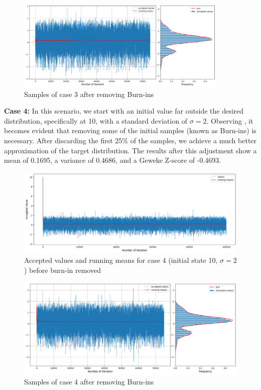 \begin{example}
	\begin{figure}[H]
		\centering
		\includegraphics[width=0.9\textwidth]{./images/metropolis/example1/sample-3-value-hist-bo.png}
		\caption{Samples of case 3 after removing Burn-ins}
		\label{fig:MH sample3 after burn in}
	\end{figure}

	\textbf{Case 4:} In this scenario, we start with an initial value far outside the desired distribution, specifically at 10, with a standard deviation of $\sigma = 2$. Observing , it becomes evident that removing some of the initial samples (known as Burn-ins) is necessary. After discarding the first 25\% of the samples, we achieve a much better approximation of the target distribution. The results after this adjustment show a mean of 0.1695, a variance of 0.4686, and a Geweke Z-score of -0.4693.

	\begin{figure}[H]
		\centering
		\includegraphics[width=1\textwidth]{./images/metropolis/example1/sample-4-values.png}
		\caption{Accepted values and running means for case 4 (initial state 10, $ \sigma = 2 $) before burn-in removed}
		\label{fig:MH sample4}
	\end{figure}

	\begin{figure}[H]
		\centering
		\includegraphics[width=1\textwidth]{./images/metropolis/example1/sample-4-value-hist-bo.png}
		\caption{Samples of case 4 after removing Burn-ins}
	\end{figure}


\end{example}
